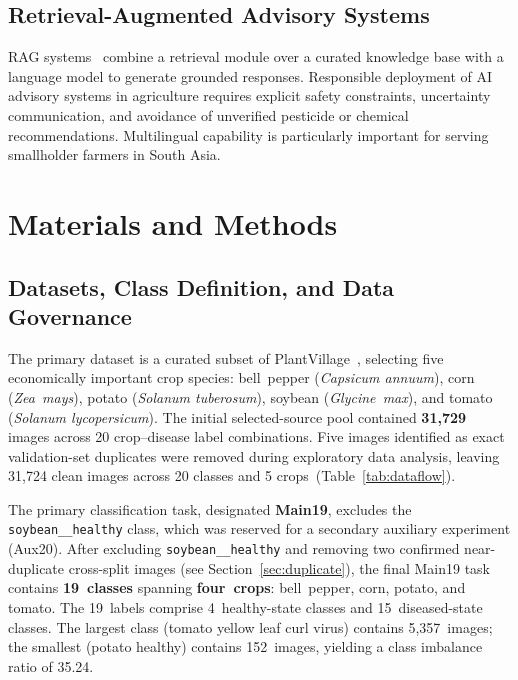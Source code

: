 \documentclass[conference]{IEEEtran}
\begin{document}
\subsection{Retrieval-Augmented Advisory Systems}

RAG systems~\cite{lewis2020retrieval} combine a
retrieval module over a curated knowledge base with a language model to
generate grounded responses. Responsible deployment of AI advisory
systems in agriculture requires explicit safety constraints,
uncertainty communication, and avoidance of unverified pesticide or
chemical
recommendations.
Multilingual capability is particularly important for serving
smallholder farmers in South
Asia.

\section{Materials and Methods}
\label{sec:methods}

\subsection{Datasets, Class Definition, and Data Governance}

The primary dataset is a curated subset of
PlantVillage~\cite{hughes2015open}, selecting five economically
important crop species: bell~pepper (\textit{Capsicum annuum}), corn
(\textit{Zea~mays}), potato (\textit{Solanum tuberosum}), soybean
(\textit{Glycine~max}), and tomato (\textit{Solanum lycopersicum}).
The initial selected-source pool contained \textbf{31{,}729} images
across 20 crop--disease label combinations. Five images identified as
exact validation-set duplicates were removed during exploratory data
analysis, leaving 31{,}724 clean images across 20 classes and 5
crops~(Table~\ref{tab:dataflow}).

The primary classification task, designated \textbf{Main19}, excludes
the \texttt{soybean\_\_healthy} class, which was reserved for a
secondary auxiliary experiment (Aux20). After excluding
\texttt{soybean\_\_healthy} and removing two confirmed near-duplicate
cross-split images (see Section~\ref{sec:duplicate}), the final
Main19 task contains \textbf{19~classes} spanning \textbf{four~crops}:
bell~pepper, corn, potato, and tomato. The 19~labels comprise
4~healthy-state classes and 15~diseased-state classes. The largest
class (tomato yellow leaf curl virus) contains 5{,}357~images; the
smallest (potato healthy) contains 152~images, yielding a class
imbalance ratio of 35.24.
\end{document}
